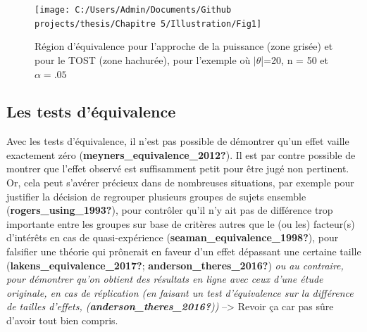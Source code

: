 \documentclass[
  english,
  man]{apa6}
\begin{document}
\begin{figure}

{\centering \texttt{[image: C:/Users/Admin/Documents/Github projects/thesis/Chapitre 5/Illustration/Fig1]} 

}

\caption{Région d'équivalence pour l'approche de la puissance (zone grisée) et pour le TOST (zone hachurée), pour l'exemple où $|\theta$|=20, n = 50 et $\alpha=.05$}\label{fig:schuirman2}
\end{figure}

\hypertarget{les-tests-duxe9quivalence}{%
\subsection{Les tests d'équivalence}\label{les-tests-duxe9quivalence}}

Avec les tests d'équivalence, il n'est pas possible de démontrer qu'un effet vaille exactement zéro (\textbf{meyners\_equivalence\_2012?}). Il est par contre possible de montrer que l'effet observé est suffisamment petit pour être jugé non pertinent. Or, cela peut s'avérer précieux dans de nombreuses situations, par exemple pour justifier la décision de regrouper plusieurs groupes de sujets ensemble (\textbf{rogers\_using\_1993?}), pour contrôler qu'il n'y ait pas de différence trop importante entre les groupes sur base de critères autres que le (ou les) facteur(s) d'intérêts en cas de quasi-expérience (\textbf{seaman\_equivalence\_1998?}), pour falsifier une théorie qui prônerait en faveur d'un effet dépassant une certaine taille (\textbf{lakens\_equivalence\_2017?}; \textbf{anderson\_theres\_2016?}) \emph{ou au contraire, pour démontrer qu'on obtient des résultats en ligne avec ceux d'une étude originale, en cas de réplication (en faisant un test d'équivalence sur la différence de tailles d'effets, (\textbf{anderson\_theres\_2016?}))} --\textgreater{} Revoir ça car pas sûre d'avoir tout bien compris.
\end{document}
